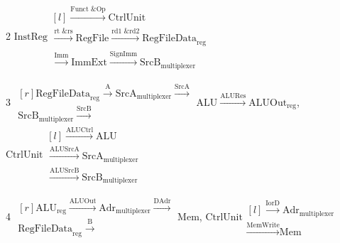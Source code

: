\documentclass{article}
\begin{document}
\begin{enumerate}
\bigbreak

2 $\text{InstReg} \begin{matrix*}[l] 
\xrightarrow{\text{Funct \& Op}} \text{CtrlUnit} \\ \xrightarrow{\text{rt \& rs}} \text{RegFile} \xrightarrow{\text{rd1 \& rd2}} \text{RegFileData}_\text{reg} \\
\xrightarrow{\text{Imm}} \text{ImmExt} \xrightarrow{\text{SignImm}} \text{SrcB}_\text{multiplexer} \end{matrix*}$\\

\bigbreak

3 $\begin{matrix*}[r] \text{RegFileData}_\text{reg} \xrightarrow{\text{A}} \text{SrcA}_\text{multiplexer} \xrightarrow{\text{SrcA}} \\ \text{SrcB}_\text{multiplexer} \xrightarrow{\text{SrcB}}\end{matrix*} \text{ALU} \xrightarrow{\text{ALURes}} \text{ALUOut}_\text{reg}$, $\text{CtrlUnit} \begin{matrix*}[l] 
\xrightarrow{\text{ALUCtrl}} \text{ALU} \\ \xrightarrow{\text{ALUSrcA}} \text{SrcA}_\text{multiplexer} \\ \xrightarrow{\text{ALUSrcB}} \text{SrcB}_\text{multiplexer} \end{matrix*}$

\bigbreak

4 $\begin{matrix*}[r] \text{ALU}_\text{reg} \xrightarrow{\text{ALUOut}} \text{Adr}_\text{multiplexer} \xrightarrow{\text{DAdr}} \\ \text{RegFileData}_\text{reg} \xrightarrow{\text{B}} \end{matrix*} \text{Mem}$, $\text{CtrlUnit} \begin{matrix*}[l] 
\xrightarrow{\text{IorD}} \text{Adr}_\text{multiplexer} \\ \xrightarrow{\text{MemWrite}} \text{Mem} \end{matrix*}$

\bigbreak


\end{enumerate}
\end{document}
